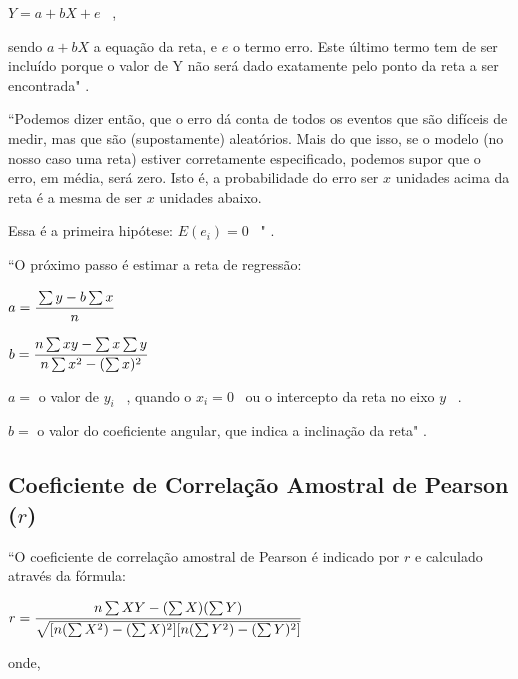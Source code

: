 		\bigskip

		{\Large $ Y = a + bX + e $} \ ,

		\bigskip

		sendo $ a + bX $ a equação da reta, e $ e $ o termo erro. Este último termo tem de ser incluído porque o valor de Y não será dado exatamente pelo ponto da reta a ser encontrada" \cite{torres}.

		\bigskip

		``Podemos dizer então, que o erro dá conta de todos os eventos que são difíceis de medir, mas que são (supostamente) aleatórios. Mais do que isso, se o modelo (no nosso caso uma reta) estiver corretamente especificado, podemos supor que o erro, em média, será zero. Isto é, a probabilidade do erro ser $ x $ unidades acima da reta é a mesma de ser $ x $ unidades abaixo.

		Essa é a primeira hipótese: $ E(e_i) = 0 $ \ " \cite{torres}.

		\bigskip			
		
		``O próximo passo é estimar a reta de regressão:
		
		\bigskip
		
		{\Large $ a = \cfrac{\sum y - b \sum x}{n} $}
		
		\bigskip
		
		{\Large $ b = \cfrac{n \sum xy - \sum x \sum y}{n \sum x^{2} - (\sum x)^{2}} $}
		
		\bigskip
		
		$ a = $ o valor de $ y_{i} $ \ , quando o $ x_{i} = 0 $ \ ou o intercepto da reta no eixo $ y $ \ .
		
		$ b = $ o valor do coeficiente angular, que indica a inclinação da reta" \cite{torres}.

	\subsection{Coeficiente de Correlação Amostral de Pearson ($ r $)}
		
		``O coeficiente de correlação amostral de Pearson é indicado por $ r $ e calculado através da fórmula:
		
		\bigskip
		
		{\Large $ r = \cfrac{n \sum X Y - ( \sum X) ( \sum Y)}{ \sqrt{ [ n ( \sum X^{2} ) - ( \sum X)^{2}] [n ( \sum Y^{2}) - ( \sum Y)^{2} ] }} $}
		
		\bigskip
		
		onde,
		
		\bigskip
		
